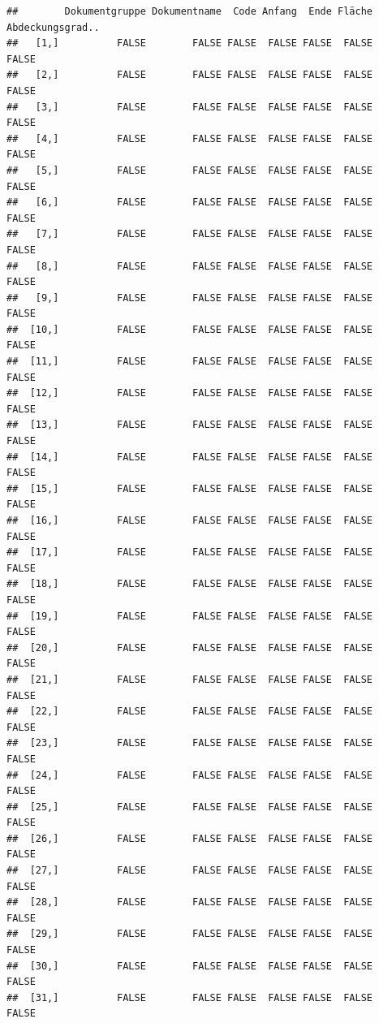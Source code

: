 \documentclass[
  english,
  man,floatsintext]{apa6}
\begin{document}
\begin{verbatim}
##        Dokumentgruppe Dokumentname  Code Anfang  Ende Fläche Abdeckungsgrad..
##   [1,]          FALSE        FALSE FALSE  FALSE FALSE  FALSE            FALSE
##   [2,]          FALSE        FALSE FALSE  FALSE FALSE  FALSE            FALSE
##   [3,]          FALSE        FALSE FALSE  FALSE FALSE  FALSE            FALSE
##   [4,]          FALSE        FALSE FALSE  FALSE FALSE  FALSE            FALSE
##   [5,]          FALSE        FALSE FALSE  FALSE FALSE  FALSE            FALSE
##   [6,]          FALSE        FALSE FALSE  FALSE FALSE  FALSE            FALSE
##   [7,]          FALSE        FALSE FALSE  FALSE FALSE  FALSE            FALSE
##   [8,]          FALSE        FALSE FALSE  FALSE FALSE  FALSE            FALSE
##   [9,]          FALSE        FALSE FALSE  FALSE FALSE  FALSE            FALSE
##  [10,]          FALSE        FALSE FALSE  FALSE FALSE  FALSE            FALSE
##  [11,]          FALSE        FALSE FALSE  FALSE FALSE  FALSE            FALSE
##  [12,]          FALSE        FALSE FALSE  FALSE FALSE  FALSE            FALSE
##  [13,]          FALSE        FALSE FALSE  FALSE FALSE  FALSE            FALSE
##  [14,]          FALSE        FALSE FALSE  FALSE FALSE  FALSE            FALSE
##  [15,]          FALSE        FALSE FALSE  FALSE FALSE  FALSE            FALSE
##  [16,]          FALSE        FALSE FALSE  FALSE FALSE  FALSE            FALSE
##  [17,]          FALSE        FALSE FALSE  FALSE FALSE  FALSE            FALSE
##  [18,]          FALSE        FALSE FALSE  FALSE FALSE  FALSE            FALSE
##  [19,]          FALSE        FALSE FALSE  FALSE FALSE  FALSE            FALSE
##  [20,]          FALSE        FALSE FALSE  FALSE FALSE  FALSE            FALSE
##  [21,]          FALSE        FALSE FALSE  FALSE FALSE  FALSE            FALSE
##  [22,]          FALSE        FALSE FALSE  FALSE FALSE  FALSE            FALSE
##  [23,]          FALSE        FALSE FALSE  FALSE FALSE  FALSE            FALSE
##  [24,]          FALSE        FALSE FALSE  FALSE FALSE  FALSE            FALSE
##  [25,]          FALSE        FALSE FALSE  FALSE FALSE  FALSE            FALSE
##  [26,]          FALSE        FALSE FALSE  FALSE FALSE  FALSE            FALSE
##  [27,]          FALSE        FALSE FALSE  FALSE FALSE  FALSE            FALSE
##  [28,]          FALSE        FALSE FALSE  FALSE FALSE  FALSE            FALSE
##  [29,]          FALSE        FALSE FALSE  FALSE FALSE  FALSE            FALSE
##  [30,]          FALSE        FALSE FALSE  FALSE FALSE  FALSE            FALSE
##  [31,]          FALSE        FALSE FALSE  FALSE FALSE  FALSE            FALSE

\end{verbatim}
\end{document}
